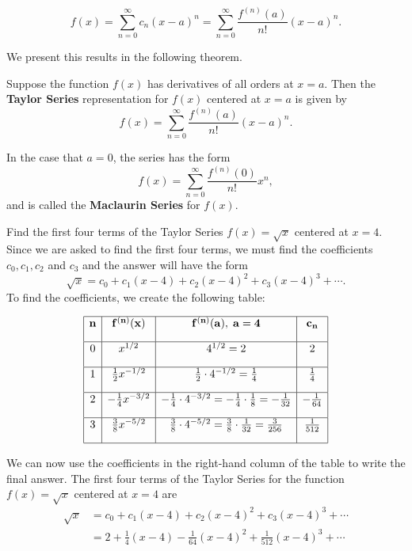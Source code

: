 \documentclass{ximera}
\begin{document}
\[
f(x) = \sum_{n=0}^\infty c_n (x-a)^n = \sum_{n=0}^\infty \frac{f^{(n)}(a)}{n!} (x-a)^n.
\]


We present this results in the following theorem.

\begin{theorem}
Suppose the function $f(x)$ has derivatives of all orders at $x = a$. Then the \textbf{Taylor Series} 
representation for $f(x)$ centered at $x = a$ is given by
\[
f(x) = \sum_{n=0}^\infty \frac{f^{(n)}(a)}{n!} (x-a)^n.
\]

 In the case that $a = 0$, the series has the form
\[
 f(x) = \sum_{n=0}^\infty \frac{f^{(n)}(0)}{n!} x^n,
\]
and is called the \textbf{Maclaurin Series} for $f(x)$.
\end{theorem}

\begin{example} Find the first four terms of the Taylor Series $f(x) = \sqrt x$ centered at $x = 4$.\\
Since we are asked to find the first four terms, we must find the coefficients $c _0, c_1, c_2$ and $c_3$
and the answer will have the form 
\[
\sqrt x = c_0 + c_1(x-4) + c_2(x-4)^2 + c_3(x-4)^3 + \cdots .
\]
To find the coefficients, we create the following table:

\[
\begin{array}{|c|c|c|c|} 
\hline
\bf{n} & \bf{f^{(n)}(x)} & \bf{f^{(n)}(a), \; a = 4} & \bf{c_n} \\[1em] 
\hline
 0 & x^{1/2} & 4^{1/2} = 2 & 2 \\[1em]
\hline
1 & \frac12 x^{-1/2} & \frac12 \cdot 4^{-1/2} = \frac14 & \frac14 \\[1em]
\hline
 2 & -\frac14 x^{-3/2} & -\frac14 \cdot 4^{-3/2} 
= -\frac14 \cdot \frac18 = -\frac{1}{32} & -\frac{1}{64} \\[1em]
\hline
 3 & \frac38 x^{-5/2} & \frac38 \cdot 4^{-5/2} = \frac38 \cdot \frac{1}{32} = \frac{3}{256} & \frac{1}{512}\\[1em]
\hline
\end{array}
\]



We can now use the coefficients in the right-hand column of the table to write the final answer. 
The first four terms of the Taylor Series for the function $f(x) = \sqrt x$ centered at $x = 4$ are
\begin{align*}
\sqrt x &= c_0 + c_1(x-4) + c_2(x-4)^2 + c_3(x-4)^3 + \cdots \\
        &= 2 + \frac14(x-4) -\frac{1}{64}(x-4)^2 + \frac{1}{512}(x-4)^3 + \cdots
\end{align*}

\end{example}
\end{document}

